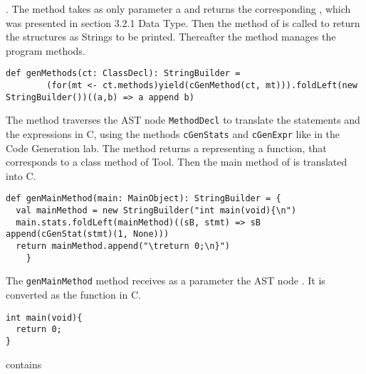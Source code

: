 \newline
\lstset{style=customscala}{\lstinline[basicstyle=\small\ttfamily]|def genStructDef(ct: ClassDecl): StructDef|}.
The method takes as only parameter a \lstset{style=customc}{\lstinline[basicstyle=\small\ttfamily]|ClassDecl|}
and returns the corresponding \lstset{style=customc}{\lstinline[basicstyle=\small\ttfamily]|StructDef|},
which was presented in section 3.2.1 Data Type. Then the method 
\lstset{style=customc}{\lstinline[basicstyle=\small\ttfamily]|toStringRepr|} of \lstset{style=customc}{\lstinline[basicstyle=\small\ttfamily]|StructDef|} is called to return the structures as Strings to be printed.
\newline
Thereafter the method manages the program methods.
\lstset{style=customscala}
\begin{lstlisting}
def genMethods(ct: ClassDecl): StringBuilder =
        (for(mt <- ct.methods)yield(cGenMethod(ct, mt))).foldLeft(new StringBuilder())((a,b) => a append b)
\end{lstlisting}
The method \lstset{style=customc}{\lstinline[basicstyle=\small\ttfamily]|cGenMethod|} traverses the AST node\newline
{\lstinline[basicstyle=\small\ttfamily]|MethodDecl|} to translate the statements and the expressions
in C, using the methods {\lstinline[basicstyle=\small\ttfamily]|cGenStats|} and
{\lstinline[basicstyle=\small\ttfamily]|cGenExpr|} like in the Code Generation lab.
The method returns a \lstset{style=customc}{\lstinline[basicstyle=\small\ttfamily]|StringBuilder|}
representing a function, that corresponds to a class method of Tool.
\newline
Then the main method of is translated into C.
\lstset{style=customscala}\begin{lstlisting}
def genMainMethod(main: MainObject): StringBuilder = {
  val mainMethod = new StringBuilder("int main(void){\n")
  main.stats.foldLeft(mainMethod)((sB, stmt) => sB append(cGenStat(stmt)(1, None)))
  return mainMethod.append("\treturn 0;\n}")
    }
\end{lstlisting}
The {\lstinline[basicstyle=\small\ttfamily]|genMainMethod|} method receives
as a parameter the AST node \lstset{style=customc}{\lstinline[basicstyle=\small\ttfamily]|MainObject|}.
It is converted as the \lstset{style=customc}{\lstinline[basicstyle=\small\ttfamily]|main|} function in C.
\begin{lstlisting}
int main(void){
  return 0;
}
\end{lstlisting}
\lstset{style=customc}{\lstinline[basicstyle=\small\ttfamily]|MainObject|} contains
